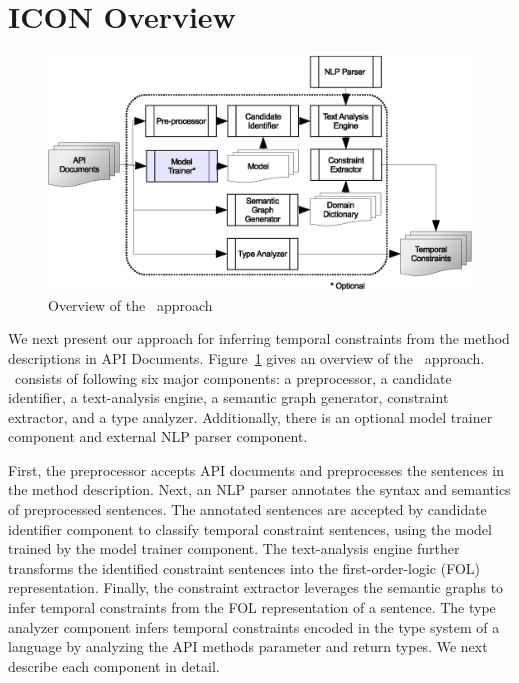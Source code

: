 \section{ICON Overview}
\label{sec:approach}

\begin{figure}
	\centering
		\includegraphics[scale=0.45]{approach.eps}
	\caption{Overview of the \tool\ approach}
	\label{fig:approachOverview}
\end{figure}

We next present our approach for inferring temporal constraints
from the method descriptions in API Documents.
Figure~\ref{fig:approachOverview} gives an overview of the \tool\ approach.
\tool\ consists of following six major components: a preprocessor, a candidate identifier, a text-analysis engine, a semantic graph generator, constraint extractor, and a type analyzer.
Additionally, there is an optional model trainer component and external NLP parser component.


First, the preprocessor accepts API documents and preprocesses the sentences in the method description.
Next, an NLP parser annotates the syntax and semantics of preprocessed sentences.   
The annotated sentences are accepted by candidate identifier component to classify temporal constraint sentences,
using the model trained by the model trainer component.
The text-analysis engine further transforms the identified constraint sentences into the first-order-logic (FOL) representation.
Finally, the constraint extractor leverages the semantic graphs to infer temporal constraints from the FOL representation of a sentence.
The type analyzer component infers temporal constraints encoded in the type system of a language by analyzing the API methods parameter and return types.
We next describe each component in detail.


